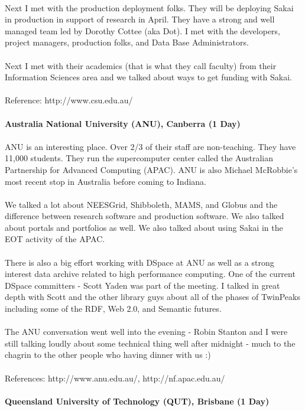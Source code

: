 \documentclass[12pt]{book}
\begin{document}
\\
Next I met with the production deployment folks.   They will be deploying Sakai in production in support of research in April.   They have a strong and well managed team led by Dorothy Cottee (aka Dot).   I met with the developers, project managers, production folks, and Data Base Administrators.   \\
\\
Next I met with their academics (that is what they call faculty) from their Information Sciences area and we talked about ways to get funding with Sakai.   \\
\\
Reference: http://www.csu.edu.au/\\
\\
{\bf Australia National University (ANU), Canberra (1 Day)}\\
\\
ANU is an interesting place.   Over 2/3 of their staff are non-teaching.   They have 11,000 students.   They run the supercomputer center called the Australian Partnership for Advanced Computing (APAC).   ANU is also Michael McRobbie's most recent stop in Australia before coming to Indiana.\\
\\
We talked a lot about NEESGrid, Shibboleth, MAMS, and Globus and the difference between research software and production software.   We also talked about portals and portfolios as well.   We also talked about using Sakai in the EOT activity of the APAC.\\
\\
There is also a big effort working with DSpace at ANU as well as a strong interest data archive related to high performance computing.   One of the current DSpace committers - Scott Yaden was part of the meeting.   I talked in great depth with Scott and the other library guys about all of the phases of TwinPeaks including some of the RDF, Web 2.0, and Semantic futures.  \\
\\
The ANU conversation went well into the evening - Robin Stanton and I were still talking loudly about some technical thing well after midnight   - much to the chagrin to the other people who having dinner with us :)\\
\\
References: http://www.anu.edu.au/, http://nf.apac.edu.au/\\
\\
{\bf Queensland University of Technology (QUT), Brisbane (1 Day)}\\
\end{document}
